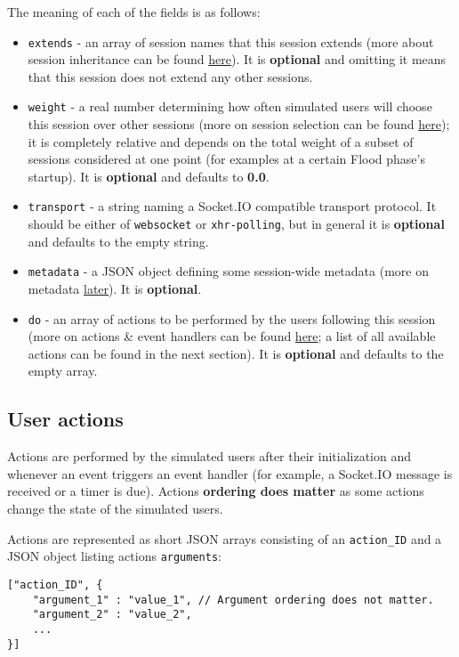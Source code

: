\documentclass[a4paper]{article}
\begin{document}
\noindent
The meaning of each of the fields is as follows:


\begin{itemize}
\item \texttt{extends} - an array of session names that this session extends (more about session inheritance can be found \hyperref[sec-2-2]{here}). It is \textbf{optional} and omitting it means that this session does not extend any other sessions.
\item \texttt{weight} - a real number determining how often simulated users will choose this session over other sessions (more on session selection can be found \hyperref[sec-2-2]{here}); it is completely relative and depends on the total weight of a subset of sessions considered at one point (for examples at a certain Flood phase's startup). It is \textbf{optional} and defaults to \textbf{0.0}.
\item \texttt{transport} - a string naming a Socket.IO compatible transport protocol. It should be either of \texttt{websocket} or \texttt{xhr-polling}, but in general it is \textbf{optional} and defaults to the empty string.
\item \texttt{metadata} - a JSON object defining some session-wide metadata (more on metadata \hyperref[sec-3-6]{later}). It is \textbf{optional}.
\item \texttt{do} - an array of actions to be performed by the users following this session (more on actions \& event handlers can be found \hyperref[sec-2-2]{here}; a list of all available actions can be found in the next section). It is \textbf{optional} and defaults to the empty array.
\end{itemize}
\subsection{User actions}
\label{sec-3-5}
\label{ref-actions}


Actions are performed by the simulated users after their initialization and whenever an event triggers an event handler (for example, a Socket.IO message is received or a timer is due). Actions \textbf{ordering does matter} as some actions change the state of the simulated users.

\noindent
Actions are represented as short JSON arrays consisting of an \texttt{action\_ID} and a JSON object listing actions \texttt{arguments}:


\begin{verbatim}
["action_ID", {
    "argument_1" : "value_1", // Argument ordering does not matter.
    "argument_2" : "value_2",
    ...
}]
\end{verbatim}
\end{document}
